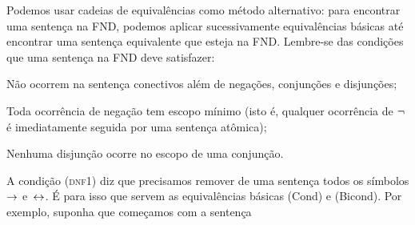 Podemos usar cadeias de equivalências como método alternativo: para encontrar uma sentença na FND, podemos aplicar sucessivamente equivalências básicas até encontrar uma sentença equivalente que esteja na FND. Lembre-se das condições que uma sentença na FND deve satisfazer:
\begin{compactlist}
	\item[(\textsc{dnf1})] Não ocorrem na sentença conectivos além de negações, conjunções e disjunções;
	\item[(\textsc{dnf2})] Toda ocorrência de negação tem escopo mínimo (isto é, qualquer ocorrência de $\neg$ é imediatamente seguida por uma sentença atômica);
	\item[(\textsc{dnf3})] Nenhuma disjunção ocorre no escopo de uma conjunção.
\end{compactlist}
A condição (\textsc{dnf1}) diz que precisamos remover de uma sentença todos os símbolos $\rightarrow$ e~$\leftrightarrow$. É para isso que servem as equivalências básicas (Cond) e (Bicond). Por exemplo, suponha que começamos com a sentença
